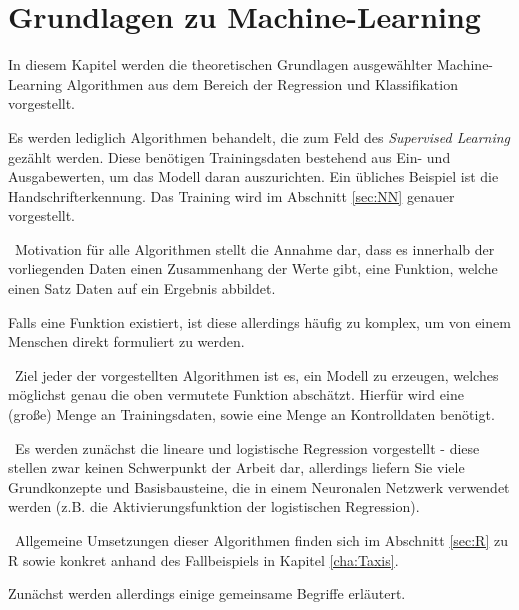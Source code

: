 \chapter{Grundlagen zu Machine-Learning}
\label{cha:MachineLearning}
\label{cha:Theorie}
In diesem Kapitel werden die theoretischen Grundlagen ausgewählter Machine-Learning Algorithmen aus dem Bereich der Regression und Klassifikation vorgestellt. 

Es werden lediglich Algorithmen behandelt, die zum Feld des \textit{Supervised Learning} gezählt werden. Diese benötigen Trainingsdaten bestehend aus Ein- und Ausgabewerten, um das Modell daran auszurichten. Ein übliches Beispiel ist die Handschrifterkennung. Das Training wird im Abschnitt \ref{sec:NN} genauer vorgestellt. 

~\newline Motivation für alle Algorithmen stellt die Annahme dar, dass es innerhalb der vorliegenden Daten einen Zusammenhang der Werte gibt, eine Funktion, welche einen Satz Daten auf ein Ergebnis abbildet. 

Falls eine Funktion existiert, ist diese allerdings häufig zu komplex, um von einem Menschen direkt formuliert zu werden.   

~\newline Ziel jeder der vorgestellten Algorithmen ist es, ein Modell zu erzeugen, welches möglichst genau die oben vermutete Funktion abschätzt. Hierfür wird eine (große) Menge an Trainingsdaten, sowie eine Menge an Kontrolldaten benötigt.

~\newline Es werden zunächst die lineare und logistische Regression vorgestellt - diese stellen zwar keinen Schwerpunkt der Arbeit dar, allerdings liefern Sie viele Grundkonzepte und Basisbausteine, die in einem Neuronalen Netzwerk verwendet werden (z.B. die Aktivierungsfunktion der logistischen Regression).    

~\newline Allgemeine Umsetzungen dieser Algorithmen finden sich im Abschnitt \ref{sec:R} zu R sowie konkret anhand des Fallbeispiels in Kapitel \ref{cha:Taxis}. 

Zunächst werden allerdings einige gemeinsame Begriffe erläutert. 



